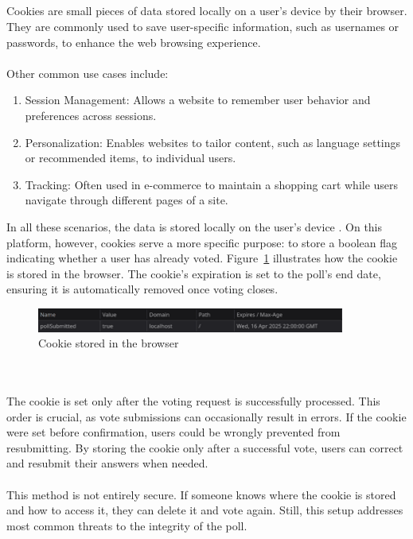 \documentclass[a4paper,12pt]{report}
\begin{document}
\\ \\ \\ \\
Cookies are small pieces of data stored locally on a user’s device by their browser. They are commonly used to save user-specific information, such as usernames or passwords, to enhance the web browsing experience. \\ \\
 Other common use cases include:
\begin{enumerate} \item Session Management: Allows a website to remember user behavior and preferences across sessions. \item Personalization: Enables websites to tailor content, such as language settings or recommended items, to individual users. \item Tracking: Often used in e-commerce to maintain a shopping cart while users navigate through different pages of a site. \end{enumerate}
In all these scenarios, the data is stored locally on the user's device \parencite{cookies}.
On this platform, however, cookies serve a more specific purpose: to store a boolean flag indicating whether a user has already voted. Figure~\ref{fig:cookie} illustrates how the cookie is stored in the browser. The cookie’s expiration is set to the poll’s end date, ensuring it is automatically removed once voting closes.
\begin{figure}[h!] 
	\centering 
	\includegraphics[width=0.9\textwidth]{pics/cookie.png} 
	\caption{Cookie stored in the browser} 
	\label{fig:cookie} 
\end{figure}\\ \\
The cookie is set only after the voting request is successfully processed. This order is crucial, as vote submissions can occasionally result in errors. If the cookie were set before confirmation, users could be wrongly prevented from resubmitting. By storing the cookie only after a successful vote, users can correct and resubmit their answers when needed.\\ \\
This method is not entirely secure. If someone knows where the cookie is stored and how to access it, they can delete it and vote again. Still, this setup addresses most common threats to the integrity of the poll.
\end{document}
